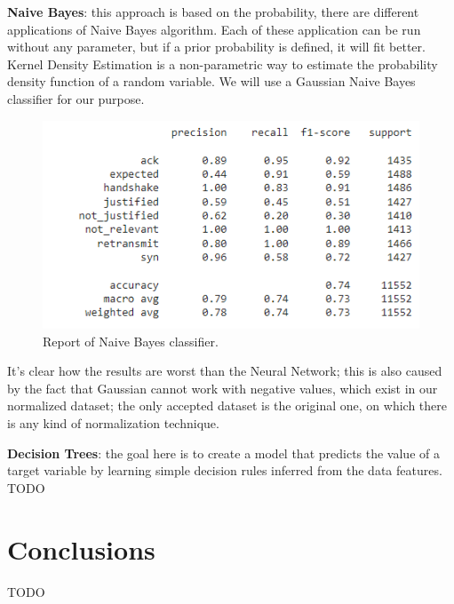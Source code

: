 \documentclass[sigconf]{acmart}
\begin{document}
    \textbf{Naive Bayes}: this approach is based on the probability, there are different applications of Naive Bayes algorithm. Each of these application can be run without any parameter, but if a prior probability is defined, it will fit better. Kernel Density Estimation is a non-parametric way to estimate the probability density function of a random variable. We will use a Gaussian Naive Bayes classifier for our purpose.
    \begin{figure}[h!]
        \includegraphics[width=\linewidth]{img/nb_classifier.png}
        \caption{Report of Naive Bayes classifier.}
        \label{fig:nb_classifier}
    \end{figure}
    It's clear how the results are worst than the Neural Network; this is also caused by the fact that Gaussian cannot work with negative values, which exist in our normalized dataset; the only accepted dataset is the original one, on which there is any kind of normalization technique.

    \textbf{Decision Trees}: the goal here is to create a model that predicts the value of a target variable by learning simple decision rules inferred from the data features.
    TODO


    \section{Conclusions}
    TODO

    
    
\end{document}
